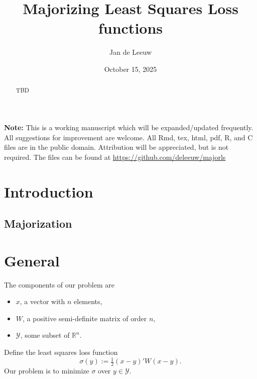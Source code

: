 \documentclass[
  12pt,
  letterpaper,
  DIV=11,
  numbers=noendperiod]{scrartcl}
\title{Majorizing Least Squares Loss functions}
\author{Jan de Leeuw}
\date{October 15, 2025}
\providecommand{\tightlist}{%
  \setlength{\itemsep}{0pt}\setlength{\parskip}{0pt}}
\newcommand{\sectionbreak}{\clearpage}
\renewcommand*\contentsname{Table of contents}
\newcommand\contentsname{Table of contents}
\begin{document}
\maketitle
\begin{abstract}
TBD
\end{abstract}

\renewcommand*\contentsname{Table of contents}
{
\hypersetup{linkcolor=}
\setcounter{tocdepth}{3}
\tableofcontents
}

\sectionbreak

\textbf{Note:} This is a working manuscript which will be
expanded/updated frequently. All suggestions for improvement are
welcome. All Rmd, tex, html, pdf, R, and C files are in the public
domain. Attribution will be appreciated, but is not required. The files
can be found at \url{https://github.com/deleeuw/majorls}

\sectionbreak

\section{Introduction}\label{introduction}

\subsection{Majorization}\label{majorization}

\section{General}\label{general}

The components of our problem are

\begin{itemize}
\tightlist
\item
  \(x\), a vector with \(n\) elements,
\item
  \(W\), a positive semi-definite matrix of order \(n\),
\item
  \(\mathcal{Y}\), some subset of \(\mathbb{R}^n\).
\end{itemize}

Define the least squares loss function \[
\sigma(y):=\tfrac12(x-y)'W(x-y).
\] Our problem is to minimize \(\sigma\) over \(y\in\mathcal{Y}\).
\end{document}
